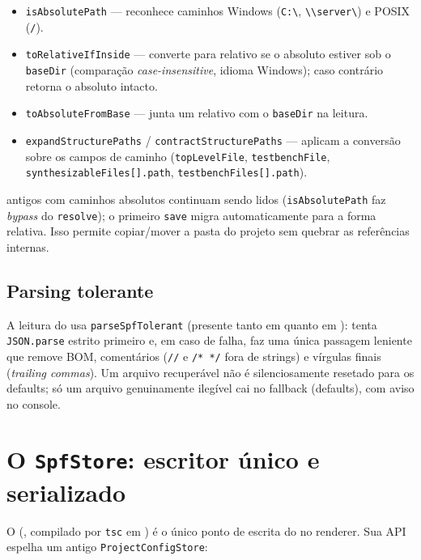 \begin{itemize}[leftmargin=1.6em]
  \item \lstinline|isAbsolutePath| — reconhece caminhos Windows
    (\lstinline|C:\|, \lstinline|\\server\|) e POSIX (\lstinline|/|).
  \item \lstinline|toRelativeIfInside| — converte para relativo se o absoluto
    estiver sob o \lstinline|baseDir| (comparação \emph{case-insensitive},
    idioma Windows); caso contrário retorna o absoluto intacto.
  \item \lstinline|toAbsoluteFromBase| — junta um relativo com o
    \lstinline|baseDir| na leitura.
  \item \lstinline|expandStructurePaths| / \lstinline|contractStructurePaths| —
    aplicam a conversão sobre os campos de caminho (\lstinline|topLevelFile|,
    \lstinline|testbenchFile|, \lstinline|synthesizableFiles[].path|,
    \lstinline|testbenchFiles[].path|).
\end{itemize}

\begin{nota}
 antigos com caminhos absolutos continuam sendo lidos
(\lstinline|isAbsolutePath| faz \emph{bypass} do \lstinline|resolve|); o
primeiro \lstinline|save| migra automaticamente para a forma relativa. Isso
permite copiar/mover a pasta do projeto sem quebrar as referências internas.
\end{nota}

\subsection{Parsing tolerante}

A leitura do  usa \lstinline|parseSpfTolerant| (presente tanto em
 quanto em ): tenta
\lstinline|JSON.parse| estrito primeiro e, em caso de falha, faz uma única
passagem leniente que remove BOM, comentários (\lstinline|//| e
\lstinline|/* */| fora de strings) e vírgulas finais (\emph{trailing commas}).
Um arquivo recuperável não é silenciosamente resetado para os defaults; só um
arquivo genuinamente ilegível cai no fallback (defaults), com aviso no console.

\section{O \texttt{SpfStore}: escritor único e serializado}
\label{sec:spfstore}

O  (, compilado por
\lstinline|tsc| em ) é o único ponto de escrita do
 no renderer. Sua API espelha um antigo \lstinline|ProjectConfigStore|:

